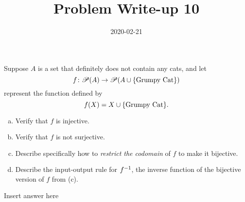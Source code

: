 \documentclass[12pt,a4paper]{article}
\title{Problem Write-up 10}
\date{2020-02-21}
\begin{document}
    \begin{problem}
        Suppose \(A\) is a set that definitely does not contain any cats, and let \[f\colon \mathscr{P}(A) \to \mathscr{P}(A \cup \{\text{Grumpy Cat}\})\] represent the function defined by \[f(X) = X \cup \{\text{Grumpy Cat}\}.\]
        \begin{enumerate}[(a)]
        	\item Verify that \(f\) is injective.
        	\item Verify that \(f\) is not surjective.
        	\item Describe specifically how to \emph{restrict the codomain} of \(f\) to make it bijective.
        	\item Describe the input-output rule for \({f}^{-{1}}\), the inverse function of the bijective version of \(f\) from (c).
        \end{enumerate}
    \end{problem}
    
    \begin{answer}
        Insert answer here
    \end{answer}
\end{document}
